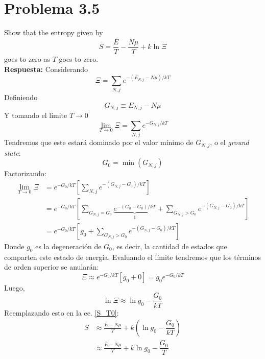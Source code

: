 \documentclass[]{article}
\numberwithin{equation}{section}
\newcommand{\0}{\textcolor{gray}{0}}
\begin{document}
\section{Problema 3.5}
Show that the entropy given by
\begin{equation}
	S = \frac{\bar{E}}{T} - \frac{\bar{N}\mu}{T} + k \ln\Xi\label{S_T0}
\end{equation}
goes to zero as \(T\) goes to zero.
\\

\textbf{Respuesta:}
Considerando
\begin{equation}
	\Xi = \sum_{N,j} e^{-(E_{N,j} - N \mu)/kT}\label{Xi}
\end{equation}
Definiendo
\begin{equation}
	G_{N,j} \equiv E_{N,j} - N \mu\label{3.5_G}
\end{equation}
Y tomando el límite \(T\rightarrow 0 \)
\begin{equation*}
	\lim_{T\rightarrow 0}\Xi = \sum_{N,j} e^{-G_{N,j}/kT}
\end{equation*}
Tendremos que este estará dominado por el valor mínimo de \(G_{N,j}\), o el \textit{ground state}:
\begin{equation}
	G_0 = \min \left(G_{N,j}\right)\label{3.5_G0}
\end{equation}
Factorizando:
\begin{align*}
	\lim_{T\rightarrow 0}\Xi &= e^{-G_0/kT} \left[ \sum_{N,j} e^{-(G_{N,j} - G_0)/kT} \right]\\
	&= e^{-G_0/kT} \left[ \sum_{G_{N,j} = G_0} \underbrace{e^{-(G_0 - G_0)/kT}}_{1} + \sum_{G_{N,j} > G_0} e^{-(G_{N,j} - G_0)/kT} \right]\\
	&= e^{-G_0/kT} \left[ g_0 + \sum_{G_{N,j} > G_0} e^{-(G_{N,j} - G_0)/kT} \right]
\end{align*}
Donde \(g_0\) es la degeneración de \(G_0\), es decir, la cantidad de estados que comparten este estado de energía. Evaluando el límite tendremos que los términos de orden superior se anularán:
\begin{equation}
	\Xi \approx e^{-G_0/kT} \left[ g_0 + 0 \right] = g_0 e^{-G_0/kT}\label{3.5_Xi_T0}
\end{equation}
Luego,
\begin{equation}
	\ln\Xi \approx\ln g_0 - \dfrac{G_0}{kT} 
\end{equation}
Reemplazando esto en la ec. \ref{S_T0}:
\begin{align*}
	S &\approx \frac{\bar{E} - \bar{N}\mu}{T} + k \left(\ln g_0 - \dfrac{G_0}{kT} \right)\\
	&\approx \frac{\bar{E} - \bar{N}\mu}{T} + k \ln g_0 - \dfrac{G_0}{T}
\end{align*}
\end{document}
